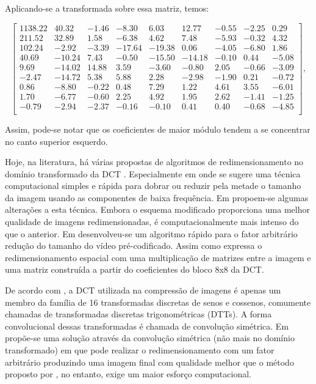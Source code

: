 Aplicando-se a transformada sobre essa matriz, temos:


\begin{center}
	\begin{equation}
\begin{bmatrix}
1138.22&	40.32&	-1.46&	-8.30&	6.03&	12.77&	-0.55&	-2.25&	0.29\\
211.52&	32.89&	1.58&	-6.38&	4.62&	7.48&	-5.93&	-0.32&	4.32\\
102.24&	-2.92&	-3.39&	-17.64&	-19.38&	0.06&	-4.05&	-6.80&	1.86\\	
40.69&	-10.24&	7.43&	-0.50&	-15.50&	-14.18&	-0.10&	0.44&	-5.08\\	
9.69&	-14.02&	14.88&	3.59&	-3.60&	-0.80&	2.05&	-0.66&	-3.09\\
-2.47&	-14.72&	5.38&	5.88&	2.28&	-2.98&	-1.90&	0.21&	-0.72\\
0.86&	-8.80&	-0.22&	0.48&	7.29&	1.22&	4.61&	3.55&	-6.01\\
1.70&	-6.77&	-0.60&	2.25&	4.92&	1.95&	2.62&	-1.41&	-1.25\\
-0.79&	-2.94&	-2.37&	-0.16&	-0.10&	0.41&	0.40&	-0.68&	-4.85\\
\end{bmatrix},	
	\end{equation}
\end{center}

\noindent Assim, pode-se notar que os coeficientes de maior módulo tendem a se concentrar no canto superior esquerdo. 

Hoje, na literatura, há várias propostas de algoritmos de redimensionamento no domínio transformado da DCT \cite{patil2006fast2,chang1995manipulation,wang2010adaptive}. Especialmente em \cite{dugad2001fast} onde se sugere uma técnica computacional simples e rápida para dobrar ou reduzir pela metade o tamanho da imagem usando as componentes de baixa frequência. Em \cite{mukherjee2002image} propoem-se algumas alterações a esta técnica. Embora o esquema modificado proporciona uma melhor qualidade de imagens redimensionadas, é computacionalmente mais intenso do que o anterior. Em \cite{patil2006fast2} desenvolveu-se um algoritmo rápido para o fator arbitrário redução do tamanho do vídeo pré-codificado. Assim como expressa o redimensionamento espacial com uma multiplicação de matrizes entre a imagem e uma matriz construída a partir do coeficientes do bloco 8x8 da DCT.

De acordo com \cite{martucci1995image}, a DCT utilizada na compressão de imagens é apenas um membro da família de 16 transformadas discretas de senos e cossenos, comumente chamadas de transformadas discretas trigonométricas (DTTs). A forma convolucional dessas transformadas é chamada de convolução simétrica. Em \cite{park2003m} propõe-se uma solução através da convolução simétrica (não mais no domínio transformado) em que pode realizar o redimensionamento com um fator arbitrário produzindo uma imagem final com qualidade melhor que o método proposto por \cite{dugad2001fast}, no entanto, exige um maior esforço computacional.

